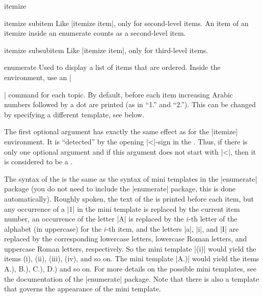\begin{environment}{{itemize}}
  \begin{element}{itemize subitem}\yes\yes\yes
    Like |itemize item|, only for second-level items. An item of an itemize inside an enumerate counts as a second-level item.
  \end{element}

  \begin{element}{itemize subsubitem}\yes\yes\yes
    Like |itemize item|, only for third-level items.
  \end{element}
\end{environment}

\begin{environment}{{enumerate}}
  Used to display a list of items that are ordered. Inside the environment, use an |\item| command for each topic. By default, before each item increasing Arabic numbers followed by a dot are printed (as in ``1.'' and ``2.''). This can be changed by specifying a different template, see below.

  The first optional argument  has exactly the same effect as for the |itemize| environment. It is ``detected'' by the opening |<|-sign in the . Thus, if there is only one optional argument and if this argument does not start with |<|, then it is considered to be a .

  The syntax of the  is the same as the syntax of mini templates in the |enumerate| package (you do not need to include the |enumerate| package, this is done automatically). Roughly spoken, the text of the  is printed before each item, but any occurrence of a |1| in the mini template is replaced by the current item number, an occurrence of the letter |A| is replaced by the $i$-th letter of the alphabet (in uppercase) for the $i$-th item, and the letters |a|, |i|, and |I| are replaced by the corresponding lowercase letters, lowercase Roman letters, and uppercase Roman letters, respectively. So the mini template |(i)| would yield the items (i), (ii), (iii), (iv), and so on. The mini template |A.)| would yield the items A.), B.), C.), D.) and so on. For more details on the possible mini templates, see the documentation of the |enumerate| package. Note that there is also a template that governs the appearance of the mini template.


\end{environment}
